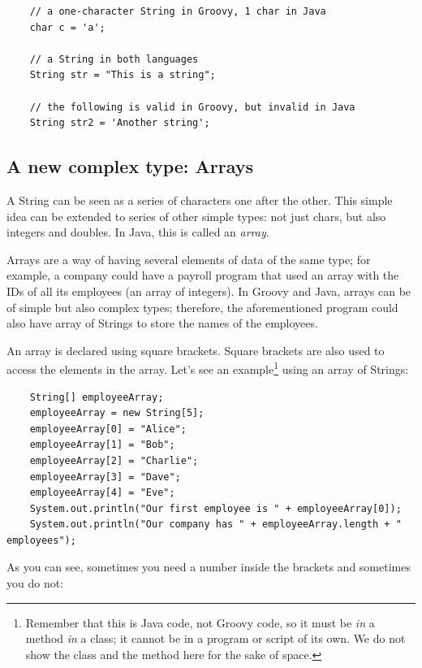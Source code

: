 \begin{verbatim}
    // a one-character String in Groovy, 1 char in Java
    char c = 'a';               

    // a String in both languages
    String str = "This is a string";

    // the following is valid in Groovy, but invalid in Java
    String str2 = 'Another string';  
\end{verbatim}

\subsection{A new complex type: Arrays}
\label{sec:arrays}

A String can be seen as a series of characters one after the
other. This simple idea can be extended to series of other simple
types: not just chars, but also integers and doubles. In Java, 
this is called an \emph{array}. 

Arrays are a way of having several elements of data of the same type;
for example, a company could have a payroll program that used an array with
the IDs of all its employees (an array of integers). In Groovy and
Java, arrays can be of simple but also complex types; therefore, the
aforementioned program could also have array of Strings to store the
names of the employees. 

An array is declared using square brackets. Square brackets are also
used to access the elements in the array. Let's see an 
example\footnote{Remember that this is Java code, not Groovy code, so
  it must be \emph{in} a method \emph{in} a class; it cannot be in a
  program or script of its own. We do not show the class and the
  method here for the sake of space.} using an
array of Strings: 

\begin{verbatim}
    String[] employeeArray;
    employeeArray = new String[5];
    employeeArray[0] = "Alice";
    employeeArray[1] = "Bob";
    employeeArray[2] = "Charlie";
    employeeArray[3] = "Dave";
    employeeArray[4] = "Eve";
    System.out.println("Our first employee is " + employeeArray[0]);
    System.out.println("Our company has " + employeeArray.length + " employees");
\end{verbatim}

As you can see, sometimes you need a number inside the brackets and
sometimes you do not: 


